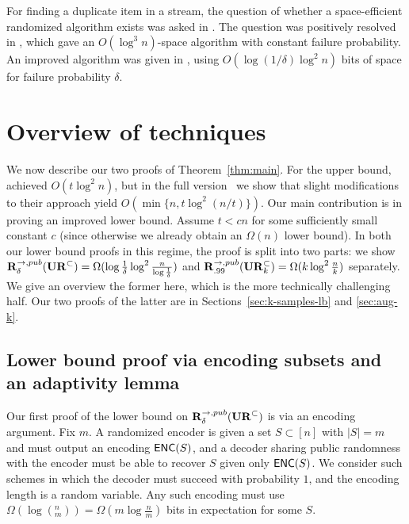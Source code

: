 For finding a duplicate item in a stream, the question of whether a space-efficient randomized algorithm exists was asked in \cite{Muthukrishnan05,Tarui07}. The question was positively resolved in \cite{GopalanR09}, which gave an $O(\log^3 n)$-space algorithm with constant failure probability. An improved algorithm was given in \cite{JowhariST11}, using $O(\log(1/\delta) \log^2 n)$ bits of space for failure probability $\delta$.

\vspace{-.1in}\section{Overview of techniques}\label{sec:overview}
We now describe our two proofs of Theorem~\ref{thm:main}. For the upper bound, \cite{JowhariST11} achieved $O(t\log^2n)$, but in the full version~\cite{KapralovNPWWY17} we show that slight modifications to their approach yield $O(\min\{n,t\log^2(n/t)\})$. Our main contribution is in proving an improved lower bound. Assume $t < cn$ for some sufficiently small constant $c$ (since otherwise we already obtain an $\Omega(n)$ lower bound). In both our lower bound proofs in this regime, the proof is split into two parts: we show $\mathbf{R}^{\rightarrow,pub}_\delta(\mathbf{UR}^\subset) = \Omega(\log \frac 1{\delta}\log^2 \frac n{\log\frac 1{\delta}})$ and $\mathbf{R}^{\rightarrow,pub}_{.99}(\mathbf{UR}_k^\subset)=\Omega(k\log^2\frac nk)$ separately. We give an overview the former here, which is the more technically challenging half. Our two proofs of the latter are in Sections~\ref{sec:k-samples-lb} and \ref{sec:aug-k}.

\subsection{Lower bound proof via encoding subsets and an adaptivity lemma}\label{sec:adaptivity-intro}

Our first proof of the lower bound on $\mathbf{R}^{\rightarrow,pub}_\delta(\mathbf{UR}^\subset)$ is via an encoding argument. Fix $m$. A randomized encoder is given a set $S\subset[n]$ with $|S| = m$ and must output an encoding $\textsf{ENC}(S)$, and a decoder sharing public randomness with the encoder must be able to recover $S$ given only $\textsf{ENC}(S)$. We consider such schemes in which the decoder must succeed with probability $1$, and the encoding length is a random variable. Any such encoding must use $\Omega(\log(^n_m)) = \Omega(m\log \frac nm)$ bits in expectation for some $S$.

